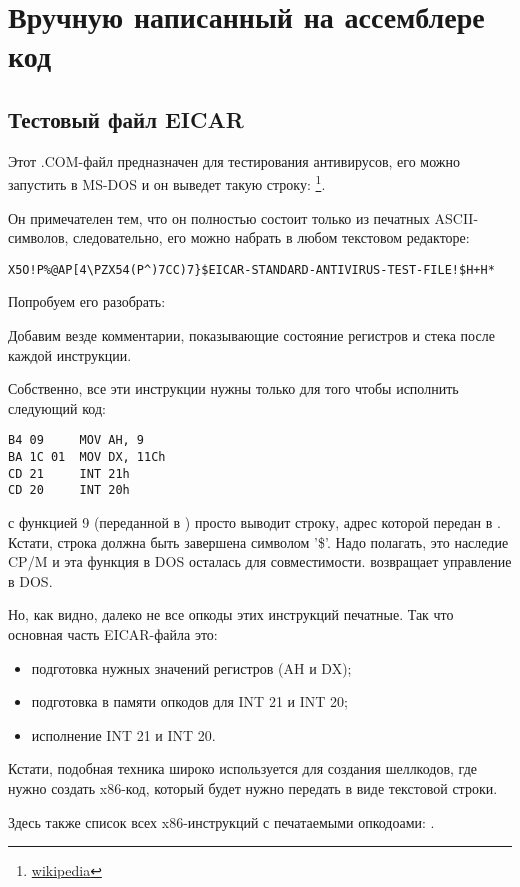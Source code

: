 \section{Вручную написанный на ассемблере код}

\subsection{Тестовый файл EICAR}
\label{subsec:EICAR}

Этот .COM-файл предназначен для тестирования антивирусов, его можно запустить в MS-DOS
и он выведет такую строку: 
\footnote{\href{http://go.yurichev.com/17005}{wikipedia}}.

Он примечателен тем, что он полностью состоит только из печатных ASCII-символов, следовательно, его можно
набрать в любом текстовом редакторе:

\begin{lstlisting}
X5O!P%@AP[4\PZX54(P^)7CC)7}$EICAR-STANDARD-ANTIVIRUS-TEST-FILE!$H+H*
\end{lstlisting}

Попробуем его разобрать:



Добавим везде комментарии, показывающие состояние регистров и стека после каждой инструкции.

Собственно, все эти инструкции нужны только для того чтобы исполнить следующий код:

\begin{lstlisting}[style=customasmx86]
B4 09     MOV AH, 9
BA 1C 01  MOV DX, 11Ch
CD 21     INT 21h
CD 20     INT 20h
\end{lstlisting}

 с функцией 9 (переданной в ) просто выводит строку, адрес которой передан в .
Кстати, строка должна быть завершена символом '\$'.
Надо полагать, это наследие \gls{CP/M} 
и эта функция в DOS осталась для совместимости.
 возвращает управление в DOS.

Но, как видно, далеко не все опкоды этих инструкций печатные.
Так что основная часть EICAR-файла это:

\begin{itemize}
\item подготовка нужных значений регистров (AH и DX);
\item подготовка в памяти опкодов для INT 21 и INT 20;
\item исполнение INT 21 и INT 20.
\end{itemize}

Кстати, подобная техника широко используется для создания шеллкодов, 
где нужно создать x86-код, который будет нужно передать в виде текстовой строки.

Здесь также список всех x86-инструкций с печатаемыми опкодоами: .
